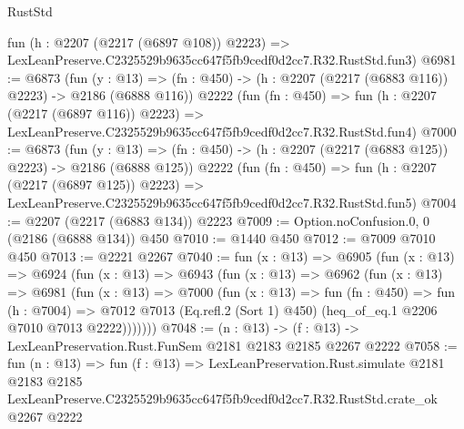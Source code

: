 \begin{lexlean}{RustStd}
\begin{coremodule}
    fun (h : @2207 (@2217 (@6897 @108)) @2223) =>
    LexLeanPreserve.C2325529b9635cc647f5fb9cedf0d2cc7.R32.RustStd.fun3)
@6981 := @6873
    (fun (y : @13) => (fn : @450) -> (h : @2207 (@2217 (@6883 @116)) @2223) -> @2186 (@6888 @116))
    @2222
    (fun (fn : @450) =>
    fun (h : @2207 (@2217 (@6897 @116)) @2223) =>
    LexLeanPreserve.C2325529b9635cc647f5fb9cedf0d2cc7.R32.RustStd.fun4)
@7000 := @6873
    (fun (y : @13) => (fn : @450) -> (h : @2207 (@2217 (@6883 @125)) @2223) -> @2186 (@6888 @125))
    @2222
    (fun (fn : @450) =>
    fun (h : @2207 (@2217 (@6897 @125)) @2223) =>
    LexLeanPreserve.C2325529b9635cc647f5fb9cedf0d2cc7.R32.RustStd.fun5)
@7004 := @2207 (@2217 (@6883 @134)) @2223
@7009 := Option.noConfusion.{0, 0} (@2186 (@6888 @134)) @450
@7010 := @1440 @450
@7012 := @7009 @7010 @450
@7013 := @2221 @2267
@7040 := fun (x : @13) =>
  @6905
    (fun (x : @13) =>
    @6924
      (fun (x : @13) =>
      @6943
        (fun (x : @13) =>
        @6962
          (fun (x : @13) =>
          @6981
            (fun (x : @13) =>
            @7000
              (fun (x : @13) =>
              fun (fn : @450) =>
              fun (h : @7004) =>
              @7012 @7013 (Eq.refl.{2} (Sort 1) @450) (heq_of_eq.{1} @2206 @7010 @7013 @2222)))))))
@7048 := (n : @13) -> (f : @13) -> LexLeanPreservation.Rust.FunSem @2181 @2183 @2185 @2267 @2222
@7058 := fun (n : @13) =>
  fun (f : @13) =>
  LexLeanPreservation.Rust.simulate
    @2181
    @2183
    @2185
    LexLeanPreserve.C2325529b9635cc647f5fb9cedf0d2cc7.R32.RustStd.crate_ok
    @2267
    @2222
\end{coremodule}
\end{lexlean}
